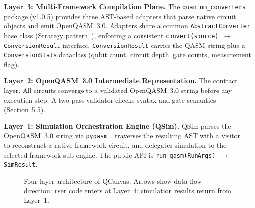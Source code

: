 \documentclass[runningheads]{llncs}
\begin{document}
\textbf{Layer~3: Multi-Framework Compilation Plane.} The \texttt{quantum\_converters} package (v1.0.5) provides three AST-based adapters that parse native circuit objects and emit OpenQASM~3.0. Adapters share a common \texttt{AbstractConverter} base class (Strategy pattern~\cite{gamma1994}), enforcing a consistent \texttt{convert(source) $\rightarrow$ ConversionResult} interface. \texttt{ConversionResult} carries the QASM string plus a \texttt{ConversionStats} dataclass (qubit count, circuit depth, gate counts, measurement flag).

\textbf{Layer~2: OpenQASM~3.0 Intermediate Representation.} The contract layer. All circuits converge to a validated OpenQASM~3.0 string before any execution step. A two-pass validator checks syntax and gate semantics (Section~5.5).

\textbf{Layer~1: Simulation Orchestration Engine (QSim).} QSim parses the OpenQASM~3.0 string via \texttt{pyqasm}~\cite{pyqasm}, traverses the resulting AST with a visitor~\cite{gamma1994} to reconstruct a native framework circuit, and delegates simulation to the selected framework sub-engine. The public API is \texttt{run\_qasm(RunArgs) $\rightarrow$ SimResult}.

\begin{figure}[htbp]
\centering
{}
\caption{Four-layer architecture of QCanvas. Arrows show data flow direction: user code enters at Layer~4; simulation results return from Layer~1.}
\label{fig:architecture}
\end{figure}
\end{document}
